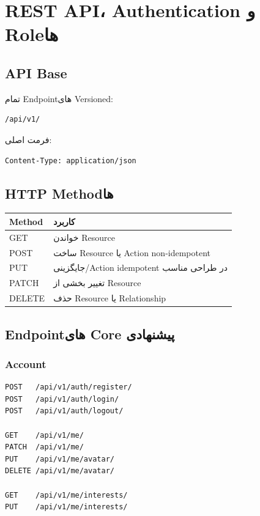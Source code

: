 
\chapter{REST API، Authentication و Roleها}

\section{API Base}

تمام Endpointهای Versioned:
\begin{latin}
\begin{lstlisting}
/api/v1/
\end{lstlisting}
\end{latin}

فرمت اصلی:
\begin{latin}
\begin{lstlisting}
Content-Type: application/json
\end{lstlisting}
\end{latin}

\section{HTTP Methodها}

\begin{longtable}{p{2.6cm}p{10cm}}
\toprule
\textbf{Method} & \textbf{کاربرد} \\
\midrule
GET & خواندن Resource \\
POST & ساخت Resource یا Action non-idempotent \\
PUT & جایگزینی/Action idempotent در طراحی مناسب \\
PATCH & تغییر بخشی از Resource \\
DELETE & حذف Resource یا Relationship \\
\bottomrule
\end{longtable}

\section{Endpointهای Core پیشنهادی}

\subsection{Account}

\begin{latin}
\begin{lstlisting}
POST   /api/v1/auth/register/
POST   /api/v1/auth/login/
POST   /api/v1/auth/logout/

GET    /api/v1/me/
PATCH  /api/v1/me/
PUT    /api/v1/me/avatar/
DELETE /api/v1/me/avatar/

GET    /api/v1/me/interests/
PUT    /api/v1/me/interests/
\end{lstlisting}
\end{latin}

